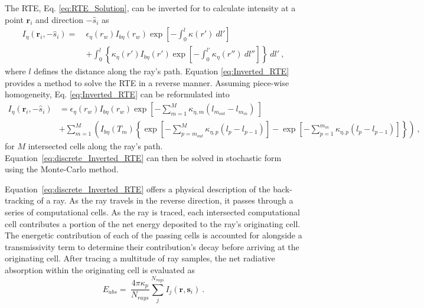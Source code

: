 The RTE, Eq. \ref{eq:RTE_Solution}, can be inverted for to calculate intensity at a point $\textbf{r}_i$ and direction $-\hat{s}_i$ as
\begin{equation}
    \begin{aligned}
    I_\eta{}(\textbf{r}_i,-\hat{s}_i) =~&\epsilon{}_\eta{}(r_w)I_{b\eta{}}(r_w)\exp{\left[-\int_0^l\kappa{}(r')~dl'\right]}\\
    &+\int_{0}^{l}{ \left\{ \kappa_\eta(r')I_{b\eta}(r')\exp{\left[-\int_0^{l'}\kappa_\eta(r'')~dl''\right]} \right\}}~dl'~,
    \label{eq:Inverted_RTE}
    \end{aligned}
\end{equation}
where $l$ defines the distance along the ray's path. Equation \ref{eq:Inverted_RTE} provides a method to solve the RTE in a reverse manner.
Assuming piece-wise homogeneity, Eq. \ref{eq:Inverted_RTE} can be reformulated into
\begin{equation}
    \begin{aligned}
    I_\eta{}(\textbf{r}_i,-\hat{s}_i)& = \epsilon{}_\eta{}(r_w)I_{b\eta{}}(r_w)\exp{\left[-\sum_{m=1}^M\kappa{}_{\eta{},m}(l_{m_{out}}-l_{m_{in}})~\right]}\\
    &+\sum_{m=1}^M\left( I_{b\eta}(T_m)\left\{ \exp{\left[-\sum_{p=m_{out}}^M\kappa{}_{\eta{},p}(l_{p}-l_{p-1})\right]}- \exp{\left[-\sum_{p=1}^{m_{in}}\kappa{}_{\eta{},p}(l_{p}-l_{p-1})\right]} \right\} \right)~,
    \label{eq:discrete_Inverted_RTE}
    \end{aligned}
\end{equation}
for $M$ intersected cells along the ray's path. Equation~\ref{eq:discrete_Inverted_RTE} can then be solved in stochastic form using the Monte-Carlo method.

Equation~\ref{eq:discrete_Inverted_RTE} offers a physical description of the back-tracking of a ray.
As the ray travels in the reverse direction, it passes through a series of computational cells. 
As the ray is traced, each intersected computational cell contributes a portion of the net energy deposited to the ray's originating cell. The energetic contribution of each of the passing cells is accounted for alongside a transmissivity term to determine their contribution's decay before arriving at the originating cell.
After tracing a multitude of ray samples, the net radiative absorption within the originating cell is evaluated as
\begin{equation}
    E_{abs}=~\frac{4\pi{}\kappa_p}{N_{rays}}\sum_j^{N_{rays}}I_j(\textbf{r},\textbf{s}_i)~.
    \label{eq:RMCRT_Absorption}
\end{equation}

